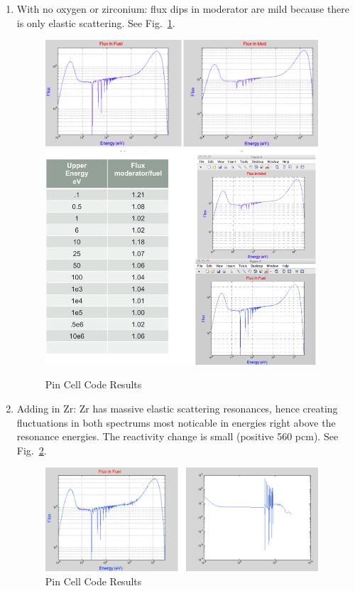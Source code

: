 \documentclass{school-22.211-notes}
\begin{document}
\begin{enumerate}
\item With no oxygen or zirconium: flux dips in moderator are mild because there is only elastic scattering. See Fig.~\ref{pc-1}. 
\begin{figure}[h]
  \centering
  \includegraphics[width=4in]{images/r-m/pc-1.png}
  \includegraphics[width=4in]{images/r-m/pc-2.png}
  \caption{Pin Cell Code Results} \label{pc-1}
\end{figure}

\item Adding in Zr: Zr has massive elastic scattering resonances, hence creating fluctuations in both spectrums most noticable in energies right above the resonance energies. The reactivity change is small (positive 560 pcm). See Fig.~\ref{pc-3}. 
\begin{figure}[h]
  \centering
  \includegraphics[width=4in]{images/r-m/pc-3.png}
  \caption{Pin Cell Code Results} \label{pc-3}
\end{figure}


\end{enumerate}
\end{document}

